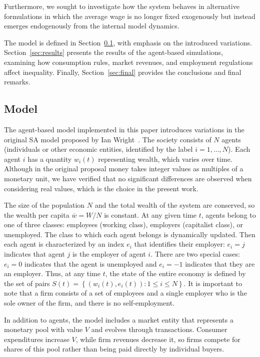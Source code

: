 Furthermore, we sought to investigate how the system behaves in alternative formulations in which the average wage is no longer fixed exogenously but instead emerges endogenously from the internal model dynamics.

The model is defined in Section~\ref{sec:model}, with emphasis on the introduced variations. Section~\ref{sec:results} presents the results of the agent-based simulations, examining how consumption rules, market revenues, and employment regulations affect inequality. Finally, Section~\ref{sec:final} provides the conclusions and final remarks.


\subsection{Model}
\label{sec:model}

The agent-based model implemented in this paper introduces variations in the original SA model proposed by Ian Wright~\cite{WRIGHT2005589}. 
%
The society consists of $N$ agents (individuals or other economic entities, identified by the label $i=1,\dots,N$). Each agent $i$ has a quantity $w_i(t)$ representing wealth, which varies over time. 
Although in the original proposal money takes integer values 
as multiples of a monetary unit, we have verified that no significant differences are observed when considering  real values, which is the choice in the present work.

The size of the population $N$ and the total wealth of the system are conserved, so the wealth per capita $\overline{w}=W/N$ is constant.
At any given time $t$, agents belong to one of three classes: employees (working class), employers (capitalist class), or unemployed. The class to which each agent belongs is dynamically updated. 
Then each  agent is characterized by an index $e_i$ that identifies their employer: $e_i=j$ indicates that agent $j$ is the employer of agent $i$. There are two special cases: $e_i=0$ indicates that the agent is unemployed and $e_i=-1$ indicates that they are an employer.  
Thus, at any time $t$, the state of the entire economy is defined by the set of pairs $S(t) = \left\{ \left( w_i(t), e_i(t) \right) :1\leq i\leq N \right\}$. It is important to note that a firm consists of a set of employees and a single  employer who is the sole owner of the firm, and there is no self-employment.

In addition to agents, the model includes a market entity that represents a monetary pool with value $V$ and evolves through transactions. Consumer expenditures increase $V$, while firm revenues decrease it, so firms compete for shares of this pool rather than being paid directly by individual buyers.

